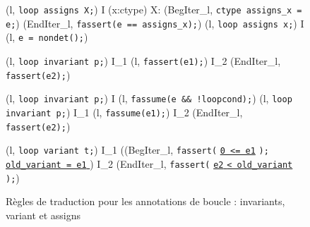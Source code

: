 \begin{figure*}[tb]
  \scriptsize{
  {
    {
      \splitfrac
      {
        (l, \mbox{\lstinline'loop assigns X;'}) 
      }
      {
        I \concat
        \forall (x:ctype) \not \in X:
        (BegIter_l, \mbox{\lstinline'ctype assigns_x = e;'})
        \concat (EndIter_l, \mbox{\lstinline'fassert(e == assigns_x);'})
      }
    }
  }
  {
    {(l, \mbox{\lstinline'loop assigns x;'})
      I \concat (l, \mbox{\lstinline'e = nondet();'})}
  }
  \vspace{-1mm}

 {
    {
      (l, \mbox{\lstinline'loop invariant p;'}) 
      I_1 \concat (l, \mbox{\lstinline'fassert(e1);'})
      \concat I_2 \concat (EndIter_l, \mbox{\lstinline'fassert(e2);'})
    }
  }

 {
    {
      (l, \mbox{\lstinline'loop invariant p;'}) 
      I \concat (l, \mbox{\lstinline'fassume(e && !loopcond);'})
    }
  }
 {
    {
      (l, \mbox{\lstinline'loop invariant p;'}) 
      I_1 \concat (l, \mbox{\lstinline'fassume(e1);'})
      \concat I_2 \concat (EndIter_l, \mbox{\lstinline'fassert(e2);'})
    }
  }
 \vspace{-1mm}

 {
   {
     \splitfrac
         {
           (l, \mbox{\lstinline'loop variant t;'}) 
         }
         {
           I_1 \concat ((BegIter_l,
           \mbox{\lstinline'fassert('}
           \underline{\mbox{\lstinline'0 <= e1'}}
           \mbox{\lstinline');' }
           \underline{\Zinit \mbox{\lstinline'old_variant = e1'} \Zclear}
           \semicolon)
           \concat I_2
           \concat(EndIter_l,
           \mbox{\lstinline'fassert('}
           \underline{\mbox{\lstinline'e2'}\Zclear
             \mbox{\lstinline'< old_variant'} \Zclear}
           \mbox{\lstinline');'})
         }
   }
 }
  }
  \caption{Règles de traduction pour les annotations de boucle : invariants,
    variant et assigns}
  \label{fig:loop-annot}
\end{figure*}
